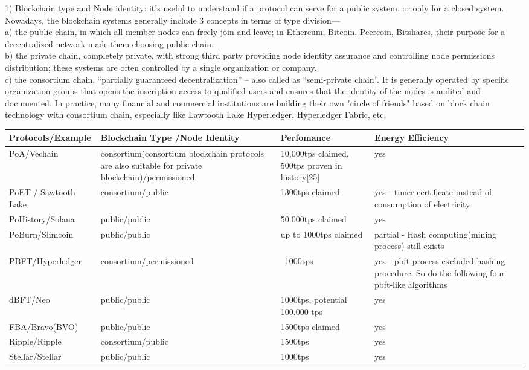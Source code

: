 \documentclass[doublespacing]{bmcart}
\begin{document}
\begin{CJK*}{UTF8}{gbsn}
1) Blockchain type and Node identity: it’s useful to understand if a protocol can serve for a public system, or only for a closed system. Nowadays, the blockchain systems generally include 3 concepts in terms of type division—
\\a)  the public chain, in which all member nodes can freely join and leave; in Ethereum, Bitcoin, Peercoin, Bitshares, their purpose for a decentralized network made them choosing public chain.
\\b) the private chain, completely private, with strong third party providing node identity assurance and controlling node permissions distribution; these systems are often controlled by a single organization or company.
\\c) the consortium chain, ``partially guaranteed decentralization'' – also called as ``semi-private chain''. It is generally operated by specific organization groups that opens the inscription access to qualified users and ensures that the identity of the nodes is audited and documented. In practice, many financial and commercial institutions are building their own "circle of friends" based on block chain technology with consortium chain, especially like Lawtooth Lake Hyperledger, Hyperledger Fabric, etc.


\begin{tabular}{p{2cm}p{3cm}p{3cm}p{3cm}}
\hline
Protocols/E\-xample & Blockchain Type \newline /Node Identity & Perfo\-mance & Energy Efficiency \\ \hline
PoA/Vechain & consortium\newline(consortium blockchain protocols are also suitable for private blockchain)/permi\-ssioned & 10,000tps claimed, 500tps proven in history[25] & yes \\ \hline
PoET / Sawtooth Lake & consortium/public & 1300tps claimed & yes - timer certificate instead of consumption of electricity  \\ \hline
PoHistory/\newline Solana & public/public & 50.000tps claimed  & yes \\ \hline
PoBurn/\newline Slimcoin & public/public & up \newline to 1000tps claimed & partial - Hash computing(mining process) still exists  \\ \hline
PBFT/Hyp\-erledger & consortium/permi\-ssioned & ~1000tps & yes - pbft process excluded hashing procedure. So do the following four pbft-like algorithms  \\ \hline
dBFT/Neo & public/public & 1000tps, potential 100.000 tps & yes  \\ \hline
FBA/Bravo\newline(BVO) & public/public & 1500tps claimed & yes  \\ \hline
Ripple/Ripple & consortium/public & 1500tps & yes \\ \hline
Stellar/Stellar & public/public & 1000tps & yes \\ \hline
\end{tabular}\\

\end{CJK*}
\end{document}
